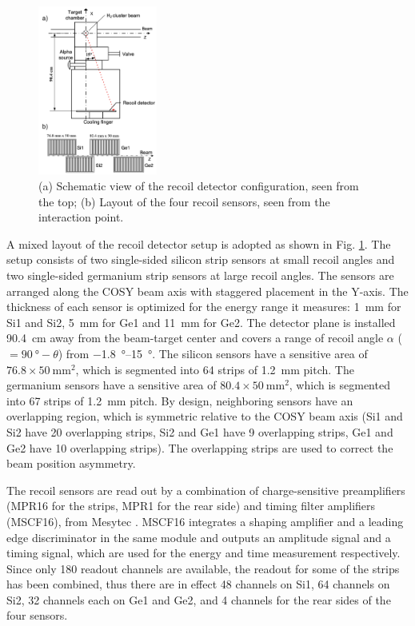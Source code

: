 \documentclass[number,5p]{elsarticle}
\begin{document}
\begin{figure}[htbp]
  \centering
  \includegraphics[width=0.35\textwidth]{./recoil_schematic.png}
  \caption{(a) Schematic view of the recoil detector configuration, seen from the
    top; (b) Layout of the four recoil sensors, seen from the interaction point.}
  \label{fig:recoil_schematic}
\end{figure}
A mixed layout of the recoil detector setup is adopted as shown in Fig. \ref{fig:recoil_schematic}.
The setup consists of two single-sided silicon strip sensors at small recoil
angles and two single-sided germanium strip sensors at large recoil angles.
The sensors are arranged along the COSY beam axis with staggered placement in the Y-axis.
The thickness of each sensor is optimized for the energy range it measures: \SI{1}{\mm} for Si1
and Si2, \SI{5}{\mm} for Ge1 and \SI{11}{\mm} for Ge2.
The detector plane is installed \SI{90.4}{\cm} away from the beam-target center
and covers a range of recoil angle $\alpha$ ($=\SI{90}{\degree}-\theta$) from \SIrange[range-units=repeat]{-1.8}{15}{\degree}.
The silicon sensors have a sensitive area of $76.8 \times \SI{50}{\mm\squared}$, which is
segmented into 64 strips of \SI{1.2}{\mm} pitch.
The germanium sensors have a sensitive area of \(80.4 \times \SI{50}{\mm\squared}\), which is segmented into 67 strips of \SI{1.2}{\mm} pitch.
By design, neighboring sensors have an overlapping region, which is symmetric
relative to the COSY beam axis (Si1 and Si2 have 20 overlapping strips, Si2 and Ge1
have 9 overlapping strips, Ge1 and Ge2 have 10 overlapping strips).
The overlapping strips are used to correct the beam position asymmetry.

The recoil sensors are read out by a combination of charge-sensitive preamplifiers (MPR16 for the strips, MPR1 for the rear side) and timing filter amplifiers (MSCF16), from Mesytec \cite{mesytec}. 
MSCF16 integrates a shaping amplifier and a leading edge discriminator in the
same module and outputs an amplitude signal and a timing signal, which are used
for the energy and time measurement respectively.
Since only 180 readout channels are available, the readout for some of the
strips has been combined, thus there are in effect 48 channels on Si1, 64
channels on Si2, 32 channels each on Ge1 and Ge2, and 4 channels for the rear sides
of the four sensors. 
\end{document}
